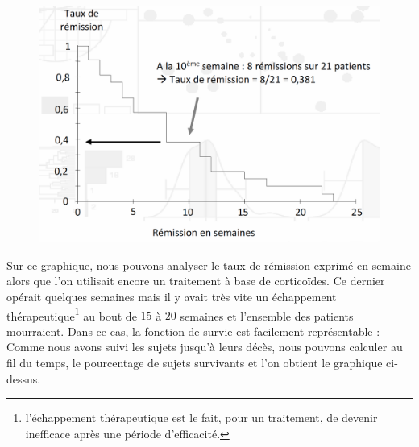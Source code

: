 \begin{figure}[H]\begin{center}\includegraphics[scale=0.5]{ilu/dsurv1.png}\end{center}\end{figure}

Sur ce graphique, nous pouvons analyser le taux de rémission exprimé en semaine alors que l'on utilisait encore un traitement à base de corticoïdes. Ce dernier opérait quelques semaines mais il y avait très vite un échappement thérapeutique\footnote{l'échappement thérapeutique est le fait, pour un traitement, de devenir inefficace après une période d'efficacité.} au bout de $15$ à $20$ semaines et l'ensemble des patients mourraient.\newline
Dans ce cas, la fonction de survie est facilement représentable : Comme nous avons suivi les sujets jusqu'à leurs décès, nous pouvons calculer au fil du temps, le pourcentage de sujets survivants et l'on obtient le graphique ci-dessus.

